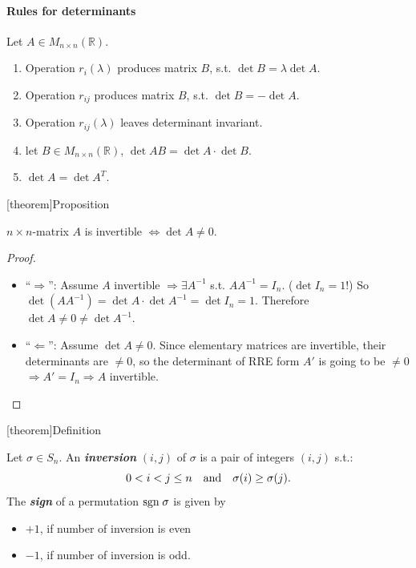 \documentclass[12pt]{report}
\theoremstyle{definition}
\begin{document}
\paragraph{Rules for determinants}
Let $A \in M_{n\times n}(\mathbb{R})$.
\begin{enumerate}[label = (\arabic*)]
    \item Operation $r_i(\lambda)$ produces matrix $B$, s.t. $\det{B} = \lambda \det{A}$.
    \item Operation $r_{ij}$ produces matrix $B$, s.t. $\det{B} = - \det{A}$.
    \item Operation $r_{ij}(\lambda)$ leaves determinant invariant.
    \item let $B \in M_{n\times n}(\mathbb{R})$, $\det{AB} = \det{A} \cdot \det{B}$.
    \item $\det{A} = \det{A^{T}}$.
\end{enumerate}

[theorem]{Proposition}
\begin{invertible matrix is not 0}
    $n\times n$-matrix $A$ is invertible $\iff \det{A} \neq 0$.
\end{invertible matrix is not 0}

\begin{proof}
    \,

    \begin{itemize}
            \item ``$\Rightarrow{}$'': Assume $A$ invertible
                $\Rightarrow{} \exists A^{-1}$ s.t. $AA^{-1} = I_n$.
                ($\det{I_n} = 1$!) So
                $\det{(AA^{-1})} = \det{A}\cdot\det{A^{-1}} = \det{I_n} = 1$.
                Therefore $\det{A} \neq 0 \neq \det{A^{-1}}$.

            \item ``$\Leftarrow$'': Assume $\det{A} \neq 0$.
                Since elementary matrices are invertible, their determinants are $\neq 0$,
                so the determinant of RRE form $A'$ is going to be $\neq 0$
                $\Rightarrow{}A' = I_n \Rightarrow{}A$ invertible.
    \end{itemize}
\end{proof}

[theorem]{Definition}
\begin{permutation theory}
    Let $\sigma \in S_n$. An \textbf{\emph{inversion}} $(i,j)$ of $\sigma$
    is a pair of integers $(i,j)$ s.t.:\[
        0 < i < j \le n \quad\textnormal{and}\quad \sigma(i)\ge\sigma(j).
    \]
    The \textbf{\emph{sign}} of a permutation $\textnormal{sgn}\;\sigma$ is given by
    \begin{itemize}
            \item $+1$, if number of inversion is even
            \item $-1$, if number of inversion is odd.
    \end{itemize}
\end{permutation theory}
\end{document}
